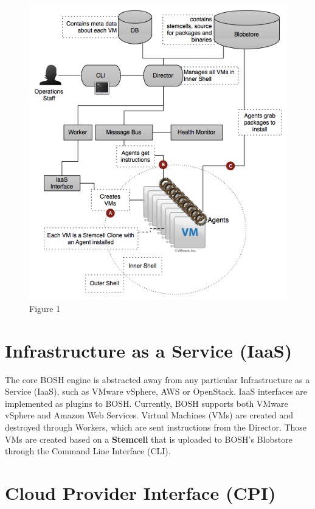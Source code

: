 \begin{figure}[htbp]
\centering
\includegraphics[keepaspectratio,width=\textwidth,height=0.75\textheight]{fig1.png}
\caption{Figure 1}
\label{}
\end{figure}


\section{Infrastructure as a Service (IaaS)}
\label{infrastructureasaserviceiaas}

The core BOSH engine is abstracted away from any particular Infrastructure as a Service (IaaS), such as VMware vSphere, AWS or OpenStack. IaaS interfaces are implemented as plugins to BOSH. Currently, BOSH supports both VMware vSphere and Amazon Web Services. Virtual Machines (VMs) are created and destroyed through Workers, which are sent instructions from the Director. Those VMs are created based on a \textbf{Stemcell} that is uploaded to BOSH's Blobstore through the Command Line Interface (CLI).

\section{Cloud Provider Interface (CPI)}
\label{cloudproviderinterfacecpi}


